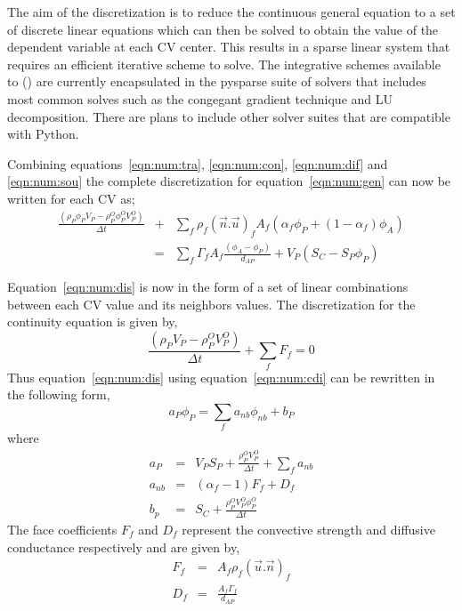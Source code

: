 The aim of the discretization is to reduce the continuous general
equation to a set of discrete linear equations which can then be
solved to obtain the value of the dependent variable at each CV
center. This results in a sparse linear system that requires an
efficient iterative scheme to solve. The integrative schemes available
to \FiPy() are currently encapsulated in the pysparse suite of solvers
that includes most common solves such as the congegant gradient
technique and LU decomposition. There are plans to include other solver
suites that are compatible with Python.

Combining equations~\eqref{eqn:num:tra}, \eqref{eqn:num:con}, \eqref{eqn:num:dif} and
\eqref{eqn:num:sou} the complete discretization for equation~\eqref{eqn:num:gen}
can now be written for each CV as;
\begin{eqnarray}
\frac{(\rho_{P} \phi_{P} V_P- \rho_P^O \phi_P^O V_P^O)}{\Delta t}
&+&
\sum_{f} \rho_f (\vec{n}.\vec{u})_f A_f (\alpha_f \phi_P +(1-\alpha_f)\phi_A)
\\
&=&
\sum_f \Gamma_f A_f \frac{(\phi_A-\phi_P)}{d_{AP}}
+ 
V_P ( S_C - S_P \phi_P )
\label{eqn:num:dis}
\end{eqnarray}

Equation~\eqref{eqn:num:dis} is now in the form of a set of linear combinations between
each CV value and its neighbors values.
The discretization for the continuity equation is given by,
\begin{equation}
\frac{(\rho_P V_P-\rho_P^O V_P^O)}{\Delta t}+\sum_f F_f = 0
\label{eqn:num:cdi}
\end{equation}
Thus equation~\eqref{eqn:num:dis} using equation~\eqref{eqn:num:cdi} can be rewritten
in the following form,
\begin{equation}
a_P \phi_P = \sum_f a_{nb} \phi_{nb} + b_P
\label{eqn:num:dap}
\end{equation}
where
\begin{eqnarray}
a_P & = & V_P S_P + \frac{\rho_P^O V_P^O}{\Delta t} + \sum_f a_{nb} \\
a_{nb} & = & ( \alpha_f - 1 ) F_f + D_f \\
b_p & = & S_C + \frac{\rho_P^O V_P^O \phi_P^O}{\Delta t} 
\end{eqnarray}
The face coefficients $F_f$ and $D_f$ represent the convective strength
and diffusive conductance respectively and are given by,
\begin{eqnarray}
F_f & = & A_f \rho_f ( \vec{u}.\vec{n} )_f \\
D_f & = & \frac{A_f \Gamma_f}{d_{AP}} 
\end{eqnarray}












